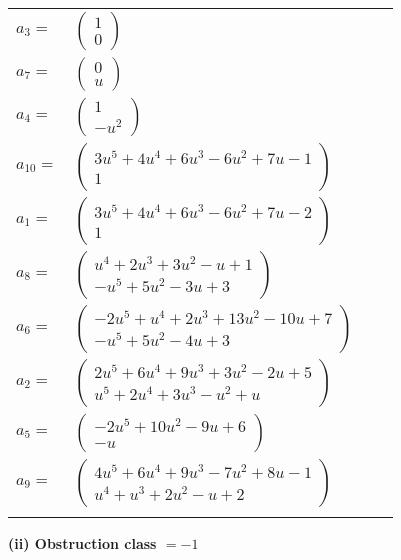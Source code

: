 \documentclass[1p]{elsarticle_modified}
\theoremstyle{definition}
\begin{document}
\begin{tabular}{m{7pt} m{180pt} m{7pt} m{180pt} }
\flushright $a_{3}=$&$\begin{pmatrix}1\\0\end{pmatrix}$ \\
\flushright $a_{7}=$&$\begin{pmatrix}0\\u\end{pmatrix}$ \\
\flushright $a_{4}=$&$\begin{pmatrix}1\\- u^2\end{pmatrix}$ \\
\flushright $a_{10}=$&$\begin{pmatrix}3 u^5+4 u^4+6 u^3-6 u^2+7 u-1\\1\end{pmatrix}$ \\
\flushright $a_{1}=$&$\begin{pmatrix}3 u^5+4 u^4+6 u^3-6 u^2+7 u-2\\1\end{pmatrix}$ \\
\flushright $a_{8}=$&$\begin{pmatrix}u^4+2 u^3+3 u^2- u+1\\- u^5+5 u^2-3 u+3\end{pmatrix}$ \\
\flushright $a_{6}=$&$\begin{pmatrix}-2 u^5+u^4+2 u^3+13 u^2-10 u+7\\- u^5+5 u^2-4 u+3\end{pmatrix}$ \\
\flushright $a_{2}=$&$\begin{pmatrix}2 u^5+6 u^4+9 u^3+3 u^2-2 u+5\\u^5+2 u^4+3 u^3- u^2+u\end{pmatrix}$ \\
\flushright $a_{5}=$&$\begin{pmatrix}-2 u^5+10 u^2-9 u+6\\- u\end{pmatrix}$ \\
\flushright $a_{9}=$&$\begin{pmatrix}4 u^5+6 u^4+9 u^3-7 u^2+8 u-1\\u^4+u^3+2 u^2- u+2\end{pmatrix}$\\&\end{tabular}
\flushleft \textbf{(ii) Obstruction class $= -1$}\\~\\
\end{document}
